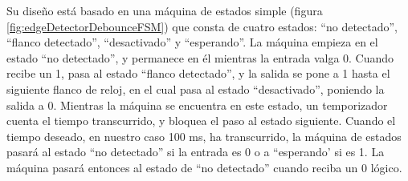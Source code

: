 Su diseño está basado en una máquina de estados simple (figura \ref{fig:edgeDetectorDebounceFSM}) que consta de cuatro estados: ``no detectado'', ``flanco detectado'', ``desactivado'' y ``esperando''. La máquina empieza en el estado ``no detectado'', y permanece en él mientras la entrada valga 0. Cuando recibe un 1, pasa al estado ``flanco detectado'', y la salida se pone a 1 hasta el siguiente flanco de reloj, en el cual pasa al estado
``desactivado'', poniendo la salida a 0. Mientras la máquina se encuentra en este estado, un temporizador cuenta el tiempo transcurrido, y bloquea el paso al estado siguiente. Cuando el tiempo deseado, en nuestro caso 100 ms,  ha transcurrido, la máquina de estados pasará al estado ``no detectado'' si la entrada es 0 o a ``esperando' si es 1. La máquina pasará entonces al estado de ``no detectado'' cuando reciba un 0 lógico.